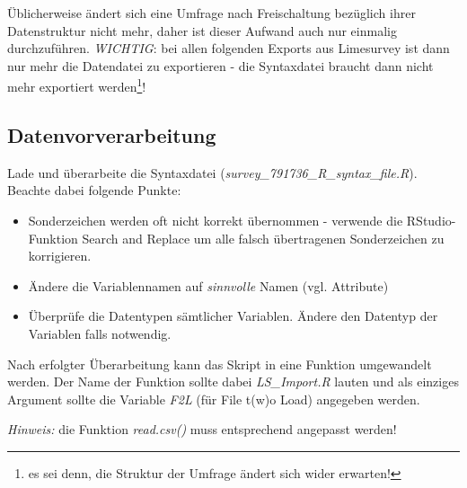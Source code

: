 \documentclass[]{article}
\newenvironment{Shaded}{\begin{snugshade}}{\end{snugshade}}
\newcommand{\KeywordTok}[1]{\textcolor[rgb]{0.13,0.29,0.53}{\textbf{#1}}}
\newcommand{\DataTypeTok}[1]{\textcolor[rgb]{0.13,0.29,0.53}{#1}}
\newcommand{\DecValTok}[1]{\textcolor[rgb]{0.00,0.00,0.81}{#1}}
\newcommand{\CharTok}[1]{\textcolor[rgb]{0.31,0.60,0.02}{#1}}
\newcommand{\StringTok}[1]{\textcolor[rgb]{0.31,0.60,0.02}{#1}}
\newcommand{\CommentTok}[1]{\textcolor[rgb]{0.56,0.35,0.01}{\textit{#1}}}
\newcommand{\OtherTok}[1]{\textcolor[rgb]{0.56,0.35,0.01}{#1}}
\newcommand{\ControlFlowTok}[1]{\textcolor[rgb]{0.13,0.29,0.53}{\textbf{#1}}}
\newcommand{\OperatorTok}[1]{\textcolor[rgb]{0.81,0.36,0.00}{\textbf{#1}}}
\newcommand{\NormalTok}[1]{#1}
\providecommand{\tightlist}{%
  \setlength{\itemsep}{0pt}\setlength{\parskip}{0pt}}
\let\rmarkdownfootnote\footnote%
\def\footnote{\protect\rmarkdownfootnote}
\begin{document}
Üblicherweise ändert sich eine Umfrage nach Freischaltung bezüglich
ihrer Datenstruktur nicht mehr, daher ist dieser Aufwand auch nur
einmalig durchzuführen. \emph{WICHTIG}: bei allen folgenden Exports aus
Limesurvey ist dann nur mehr die Datendatei zu exportieren - die
Syntaxdatei braucht dann nicht mehr exportiert werden\footnote{es sei
  denn, die Struktur der Umfrage ändert sich wider erwarten!}!

\subsection*{Datenvorverarbeitung}\label{datenvorverarbeitung}

Lade und überarbeite die Syntaxdatei
(\emph{survey\_791736\_R\_syntax\_file.R}). Beachte dabei folgende
Punkte:

\begin{itemize}
\tightlist
\item
  Sonderzeichen werden oft nicht korrekt übernommen - verwende die
  RStudio-Funktion Search and Replace um alle falsch übertragenen
  Sonderzeichen zu korrigieren.
\item
  Ändere die Variablennamen auf \emph{sinnvolle} Namen (vgl. Attribute)
\item
  Überprüfe die Datentypen sämtlicher Variablen. Ändere den Datentyp der
  Variablen falls notwendig.
\end{itemize}

Nach erfolgter Überarbeitung kann das Skript in eine Funktion
umgewandelt werden. Der Name der Funktion sollte dabei
\emph{LS\_Import.R} lauten und als einziges Argument sollte die Variable
\emph{F2L} (für File t(w)o Load) angegeben werden.

\emph{Hinweis:} die Funktion \emph{read.csv()} muss entsprechend
angepasst werden!

\begin{Shaded}
\end{Shaded}
\end{document}
